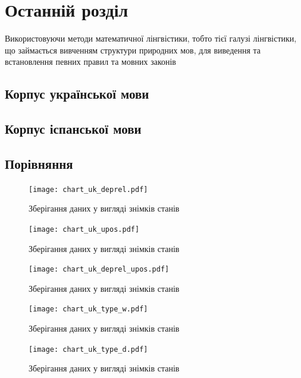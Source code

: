 \section{Останній розділ}

Використовуючи методи математичної лінгвістики, тобто тієї галузі лінгвістики,
що займається вивченням структури природних мов, для виведення та встановлення
певних правил та мовних законів

\subsection{Корпус української мови}
\subsection{Корпус іспанської мови}
\subsection{Порівняння}


\begin{figure}[ht]
  \begin{center}
    \texttt{[image: chart\_uk\_deprel.pdf]}
  \end{center}
  \caption{Зберігання даних у вигляді знімків станів}
  \label{img:0}
\end{figure}

\begin{figure}[ht]
  \begin{center}
    \texttt{[image: chart\_uk\_upos.pdf]}
  \end{center}
  \caption{Зберігання даних у вигляді знімків станів}
  \label{img:1}
\end{figure}

\begin{figure}[ht]
  \begin{center}
    \texttt{[image: chart\_uk\_deprel\_upos.pdf]}
  \end{center}
  \caption{Зберігання даних у вигляді знімків станів}
  \label{img:2}
\end{figure}

\begin{figure}[ht]
  \begin{center}
    \texttt{[image: chart\_uk\_type\_w.pdf]}
  \end{center}
  \caption{Зберігання даних у вигляді знімків станів}
  \label{img:3}
\end{figure}

\begin{figure}[ht]
  \begin{center}
    \texttt{[image: chart\_uk\_type\_d.pdf]}
  \end{center}
  \caption{Зберігання даних у вигляді знімків станів}
  \label{img:4}
\end{figure}

